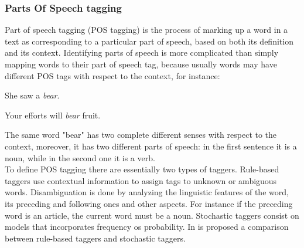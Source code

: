 \subsubsection{Parts Of Speech tagging}
Part of speech tagging (POS tagging) is the process of marking up a word in a text as corresponding to a particular part of speech, based on both its definition and its context. Identifying parts of speech is more complicated than simply mapping words to their part of speech tag, because usually words may have different POS tags with respect to the context, for instance:
\begin{description}
	\item She saw a \textit{bear}.
	\item Your efforts will \textit{bear} fruit.
\end{description}
The same word "bear" has two complete different senses with respect to the context, moreover, it has two different parts of speech: in the first sentence it is a noun, while in the second one it is a verb.\\
To define POS tagging there are essentially two types of taggers. Rule-based taggers use contextual information to assign tags to unknown or ambiguous words. Disambiguation is done by analyzing the linguistic features of the word, its preceding and following ones and other aspects. For instance if the preceding word is an article, the current word must be a noun. Stochastic taggers consist on models that incorporates frequency os probability. In \cite{articlepos} is proposed a comparison between rule-based taggers and stochastic taggers.


